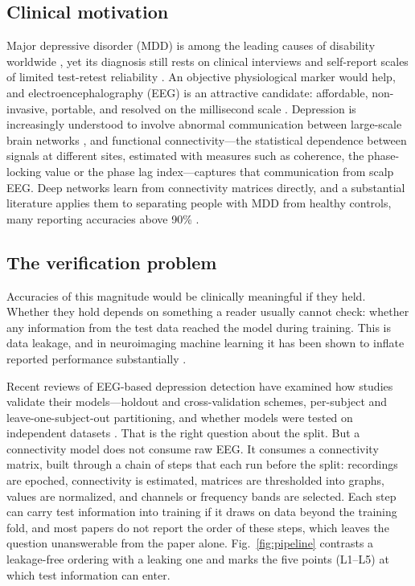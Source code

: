 
\subsection{Clinical motivation}
Major depressive disorder (MDD) is among the leading causes of disability worldwide \cite{ferrari2013}, yet its diagnosis still rests on clinical interviews and self-report scales of limited test-retest reliability \cite{lin2024,regier2013}. An objective physiological marker would help, and electroencephalography (EEG) is an attractive candidate: affordable, non-invasive, portable, and resolved on the millisecond scale \cite{simmatis2023}. Depression is increasingly understood to involve abnormal communication between large-scale brain networks \cite{kaiser2015}, and functional connectivity---the statistical dependence between signals at different sites, estimated with measures such as coherence, the phase-locking value or the phase lag index---captures that communication from scalp EEG. Deep networks learn from connectivity matrices directly, and a substantial literature applies them to separating people with MDD from healthy controls, many reporting accuracies above 90\% \cite{kaur2025}.

\subsection{The verification problem}
Accuracies of this magnitude would be clinically meaningful if they held. Whether they hold depends on something a reader usually cannot check: whether any information from the test data reached the model during training. This is data leakage, and in neuroimaging machine learning it has been shown to inflate reported performance substantially \cite{rosenblatt2024,yagis2021,lee2023}.

Recent reviews of EEG-based depression detection have examined how studies validate their models---holdout and cross-validation schemes, per-subject and leave-one-subject-out partitioning, and whether models were tested on independent datasets \cite{lin2024,lunaguevara2026}. That is the right question about the split. But a connectivity model does not consume raw EEG. It consumes a connectivity matrix, built through a chain of steps that each run before the split: recordings are epoched, connectivity is estimated, matrices are thresholded into graphs, values are normalized, and channels or frequency bands are selected. Each step can carry test information into training if it draws on data beyond the training fold, and most papers do not report the order of these steps, which leaves the question unanswerable from the paper alone. Fig.~\ref{fig:pipeline} contrasts a leakage-free ordering with a leaking one and marks the five points (L1--L5) at which test information can enter.

